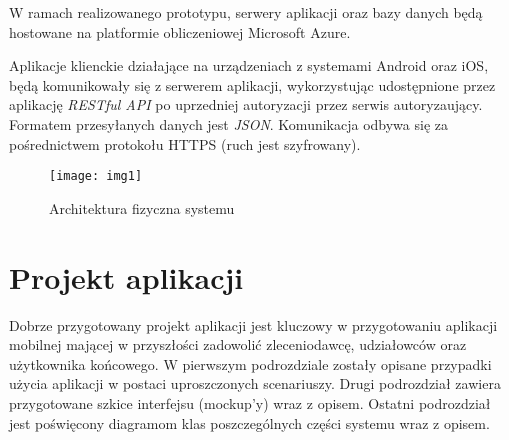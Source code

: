 \par W ramach realizowanego prototypu, serwery aplikacji oraz bazy danych będą hostowane na platformie obliczeniowej Microsoft Azure. 

\par Aplikacje klienckie działające na urządzeniach z systemami Android oraz iOS, będą komunikowały się z serwerem aplikacji, wykorzystując udostępnione przez aplikację \textit{RESTful API} po uprzedniej autoryzacji przez serwis autoryzaujący. Formatem przesyłanych danych jest \textit{JSON}. Komunikacja odbywa się za pośrednictwem protokołu HTTPS (ruch jest szyfrowany).
\begin{figure}[h]
\centering
\texttt{[image: img1]}
\caption{Architektura fizyczna systemu}
\end{figure}
\chapter{Projekt aplikacji}
Dobrze przygotowany projekt aplikacji jest kluczowy w przygotowaniu aplikacji mobilnej mającej w przyszłości zadowolić zleceniodawcę, udziałowców oraz użytkownika końcowego. W pierwszym podrozdziale zostały opisane przypadki użycia aplikacji w postaci uproszczonych scenariuszy. Drugi podrozdział zawiera przygotowane szkice interfejsu (mockup'y) wraz z opisem. Ostatni podrozdział jest poświęcony diagramom klas poszczególnych części systemu wraz z opisem.
